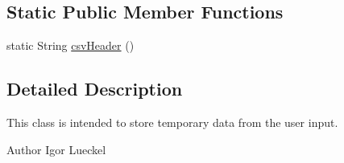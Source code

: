 \subsection*{Static Public Member Functions}
\begin{DoxyCompactItemize}
\item 
static String \hyperlink{classcom_1_1ovgu_1_1util_1_1_database_entry_a2cacf692bcb29a4a8af62f079f0883cb}{csv\-Header} ()
\end{DoxyCompactItemize}


\subsection{Detailed Description}
This class is intended to store temporary data from the user input. \begin{DoxyAuthor}{Author}
Igor Lueckel 
\end{DoxyAuthor}


